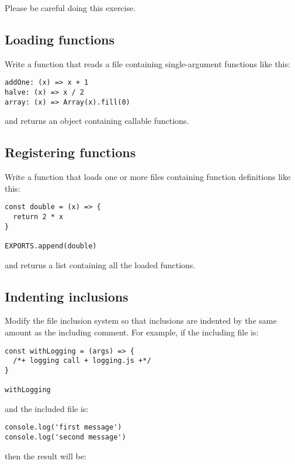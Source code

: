 \documentclass[krantzl]{krantz}
\begin{document}
\noindent Please be careful doing this exercise.

\subsection*{Loading functions}


Write a function that reads a file containing single-argument functions like this:

\begin{lstlisting}[frame=tblr]
addOne: (x) => x + 1
halve: (x) => x / 2
array: (x) => Array(x).fill(0)
\end{lstlisting}


\noindent and returns an object containing callable functions.

\subsection*{Registering functions}


Write a function that loads one or more files containing function definitions like this:

\begin{lstlisting}[frame=tblr]
const double = (x) => {
  return 2 * x
}

EXPORTS.append(double)
\end{lstlisting}


\noindent and returns a list containing all the loaded functions.

\subsection*{Indenting inclusions}


Modify the file inclusion system
so that inclusions are indented by the same amount as the including comment.
For example,
if the including file is:

\begin{lstlisting}[frame=tblr]
const withLogging = (args) => {
  /*+ logging call + logging.js +*/
}

withLogging
\end{lstlisting}


\noindent and the included file is:

\begin{lstlisting}[frame=tblr]
console.log('first message')
console.log('second message')
\end{lstlisting}


\noindent then the result will be:
\end{document}
